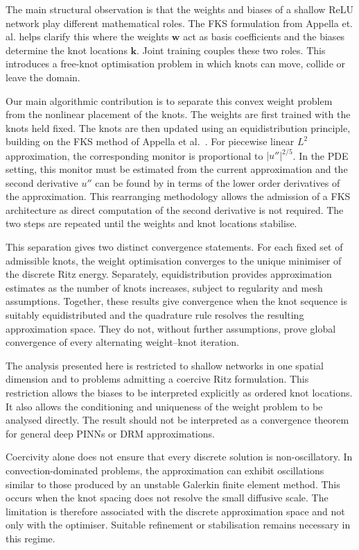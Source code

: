 \documentclass[11pt, onecolumn]{report}
\begin{document}
The main structural observation is that the weights and biases of a shallow ReLU network play different mathematical roles. The FKS formulation from Appella et. al. \cite{AppellaEtAl} helps clarify this where the weights $\mathbf{w}$ act as basis coefficients and the biases determine the knot locations $\mathbf{k}$. Joint training couples these two roles. This introduces a free-knot optimisation problem in which knots can move, collide or leave the domain.

Our main algorithmic contribution is to separate this convex weight problem from the nonlinear placement of the knots. The weights are first trained with the knots held fixed. The knots are then updated using an equidistribution principle, building on the FKS method of Appella et al.\ \cite{AppellaEtAl}. For piecewise linear $L^2$ approximation, the corresponding monitor is proportional to $|u''|^{2/5}$. In the PDE setting, this monitor must be estimated from the current approximation and the second derivative $u''$ can be found by in terms of the lower order derivatives of the approximation. This rearranging methodology allows the admission of a FKS architecture as direct computation of the second derivative is not required. The two steps are repeated until the weights and knot locations stabilise.

This separation gives two distinct convergence statements. For each fixed set of admissible knots, the weight optimisation converges to the unique minimiser of the discrete Ritz energy. Separately, equidistribution provides approximation estimates as the number of knots increases, subject to regularity and mesh assumptions. Together, these results give convergence when the knot sequence is suitably equidistributed and the quadrature rule resolves the resulting approximation space. They do not, without further assumptions, prove global convergence of every alternating weight--knot iteration.

The analysis presented here is restricted to shallow networks in one spatial dimension and to problems admitting a coercive Ritz formulation. This restriction allows the biases to be interpreted explicitly as ordered knot locations. It also allows the conditioning and uniqueness of the weight problem to be analysed directly. The result should not be interpreted as a convergence theorem for general deep PINNs or DRM approximations.

Coercivity alone does not ensure that every discrete solution is non-oscillatory. In convection-dominated problems, the approximation can exhibit oscillations similar to those produced by an unstable Galerkin finite element method. This occurs when the knot spacing does not resolve the small diffusive scale. The limitation is therefore associated with the discrete approximation space and not only with the optimiser. Suitable refinement or stabilisation remains necessary in this regime.
\end{document}
